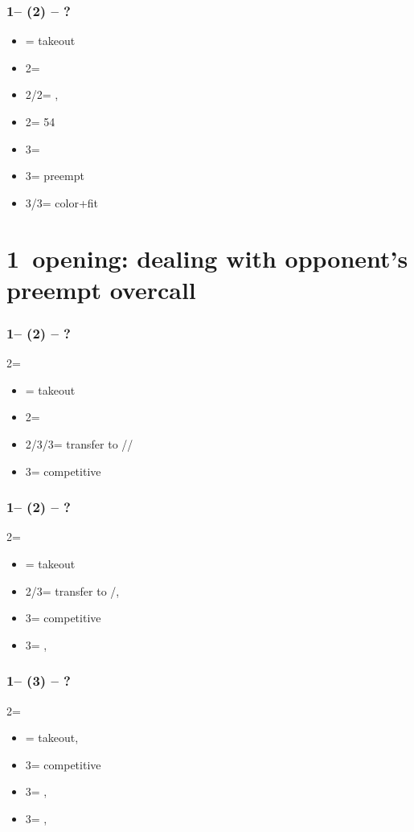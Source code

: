 \subsubsection*{1\diams -- (2\clubs) -- ?}
\begin{itemize}
    \item \dbl = takeout
    \item 2\diams = \nat
    \item 2\hearts/2\spades = \nat, \fonce
    \item 2\nt = 54\major
    \item 3\clubs = \diams\ \invp
    \item 3\diams = preempt
    \item 3\hearts/3\spades = color+fit
\end{itemize}

\section{\texorpdfstring{1\diams\ opening: dealing with opponent's preempt overcall}{oppsOvercallTfx1dPreempt}}\label{sec:oppsOvercallTfx1dPreempt}

\subsubsection*{1\diams -- (2\hearts) -- ?}
2\nt = \minor
\begin{itemize}
    \item \dbl = takeout
    \item 2\spades = \nat\ \nf
    \item 2\nt/3\clubs/3\hearts = transfer to \clubs/\diams/\spades \invp
    \item 3\diams = competitive
\end{itemize}

\subsubsection*{1\diams -- (2\spades) -- ?}
2\nt = \minor
\begin{itemize}
    \item \dbl = takeout
    \item 2\nt/3\clubs = transfer to \clubs/\diams, \invp
    \item 3\diams = competitive
    \item 3\hearts = \nat, \gf
\end{itemize}

\subsubsection*{1\diams -- (3\clubs) -- ?}
2\nt = \minor
\begin{itemize}
    \item \dbl = takeout, \gf
    \item 3\diams = competitive
    \item 3\hearts = \spades, \invp
    \item 3\spades = \hearts, \gf
\end{itemize}

